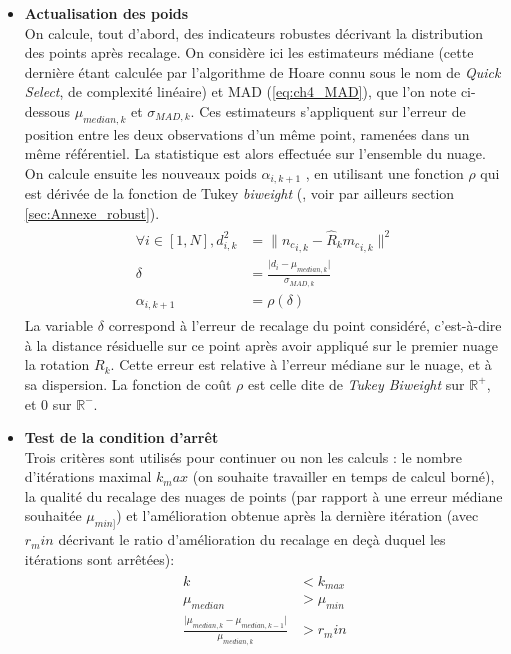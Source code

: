 \begin{enumerate}
\begin{itemize}
		\item{\textbf{Actualisation des poids}}\\
		On calcule, tout d'abord, des indicateurs robustes décrivant la distribution des points après recalage. On considère ici les estimateurs médiane (cette dernière étant calculée par l'algorithme de Hoare connu sous le nom de \emph{Quick Select}, de complexité linéaire) et MAD (\ref{eq:ch4_MAD}), que l'on note ci-dessous $\mu_{median,k}$ et $\sigma_{MAD,k}$. Ces estimateurs s'appliquent sur l'erreur de position entre les deux observations d'un même point, ramenées dans un même référentiel. La statistique est alors effectuée sur l'ensemble du nuage. \\
		On calcule ensuite les nouveaux poids $\alpha_{i,k+1}$ , en utilisant une fonction $\rho$ qui est dérivée de la fonction de Tukey \emph{biweight} (\cite{Huber1981}, voir par ailleurs section \ref{sec:Annexe_robust}).
		\begin{align}
			\begin{split}
				\forall i \in [1,N], d_{i,k}^2 &= \| {n_c}_{i,k} - \hat{R}_k {m_c}_{i,k}\|^2 \\
				\delta &= \frac{\lvert d_i - \mu_{median, k}\rvert}{\sigma_{MAD, k}} \\
				\alpha_{i,k+1} &= \rho(\delta)
			\end{split}
		\end{align}
		La variable $\delta$ correspond à l'erreur de recalage du point considéré, c'est-à-dire à la distance résiduelle sur ce point après avoir appliqué sur le premier nuage la rotation $R_k$. Cette erreur est relative à l'erreur médiane sur le nuage, et à sa dispersion. La fonction de coût $\rho$ est celle dite de \emph{Tukey Biweight} sur $\mathbb{R}^+$, et 0 sur $\mathbb{R}^-$.\\
		
		\item{\textbf{Test de la condition d'arrêt}}\\
		Trois critères sont utilisés pour continuer ou non les calculs : le nombre d'itérations maximal $k_max$ (on souhaite travailler en temps de calcul borné), la qualité du recalage des nuages de points (par rapport à une erreur médiane souhaitée $\mu_{min]}$) et l'amélioration obtenue après la dernière itération (avec $r_min$ décrivant le ratio d'amélioration du recalage en deçà duquel les itérations sont arrêtées):
		\begin{align}
			\begin{split}
				k &< k_{max} \\
				\mu_{median} &> \mu_{min} \\
				\frac{\lvert \mu_{median, k} - \mu_{median, k-1} \rvert}{\mu_{median, k}} &> r_min
			\end{split}
		\end{align}\\
	\end{itemize}
\end{enumerate}

